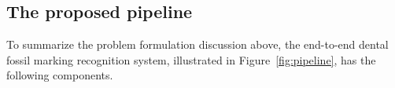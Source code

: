 \documentclass[english,twoside,openright]{UH_DS_MSc}
\begin{document}
\subsection{The proposed pipeline}
\label{sect:pipeline}

To summarize the problem formulation discussion above, the end-to-end dental fossil marking recognition system,
illustrated in Figure~\ref{fig:pipeline}, has 
the following components. 
\end{document}
